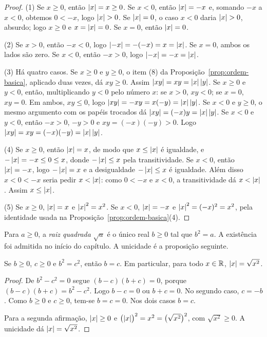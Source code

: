\documentclass[11pt,a4paper]{article}
\begin{document}
\begin{proof}
(1) Se $x\ge 0$, então $\left\lvert x \right\rvert=x\ge 0$. Se $x<0$, então $\left\lvert x \right\rvert=-x$ e, somando $-x$ a $x<0$, obtemos $0<-x$, logo $\left\lvert x \right\rvert>0$. Se $\left\lvert x \right\rvert=0$, o caso $x<0$ daria $\left\lvert x \right\rvert>0$, absurdo; logo $x\ge 0$ e $x=\left\lvert x \right\rvert=0$. Se $x=0$, então $\left\lvert x \right\rvert=0$.

(2) Se $x>0$, então $-x<0$, logo $\left\lvert -x \right\rvert=-(-x)=x=\left\lvert x \right\rvert$. Se $x=0$, ambos os lados são zero. Se $x<0$, então $-x>0$, logo $\left\lvert -x \right\rvert=-x=\left\lvert x \right\rvert$.

(3) Há quatro casos.
Se $x\ge 0$ e $y\ge 0$, o item (8) da Proposição~\ref{prop:ordem-basica}, aplicado duas vezes, dá $xy\ge 0$. Assim $\left\lvert xy \right\rvert=xy=\left\lvert x \right\rvert\left\lvert y \right\rvert$.
Se $x\ge 0$ e $y<0$, então, multiplicando $y<0$ pelo número $x$: se $x>0$, $xy<0$; se $x=0$, $xy=0$. Em ambos, $xy\le 0$, logo $\left\lvert xy \right\rvert=-xy=x(-y)=\left\lvert x \right\rvert\left\lvert y \right\rvert$.
Se $x<0$ e $y\ge 0$, o mesmo argumento com os papéis trocados dá $\left\lvert xy \right\rvert=(-x)y=\left\lvert x \right\rvert\left\lvert y \right\rvert$.
Se $x<0$ e $y<0$, então $-x>0$, $-y>0$ e $xy=(-x)(-y)>0$. Logo $\left\lvert xy \right\rvert=xy=(-x)(-y)=\left\lvert x \right\rvert\left\lvert y \right\rvert$.

(4) Se $x\ge 0$, então $\left\lvert x \right\rvert=x$, de modo que $x\le\left\lvert x \right\rvert$ é igualdade, e $-\left\lvert x \right\rvert=-x\le 0\le x$, donde $-\left\lvert x \right\rvert\le x$ pela transitividade.
Se $x<0$, então $\left\lvert x \right\rvert=-x$, logo $-\left\lvert x \right\rvert=x$ e a desigualdade $-\left\lvert x \right\rvert\le x$ é igualdade. Além disso $x<0<-x$ seria pedir $x<\left\lvert x \right\rvert$: como $0<-x$ e $x<0$, a transitividade dá $x<\left\lvert x \right\rvert$. Assim $x\le\left\lvert x \right\rvert$.

(5) Se $x\ge 0$, $\left\lvert x \right\rvert=x$ e $\left\lvert x \right\rvert^2=x^2$. Se $x<0$, $\left\lvert x \right\rvert=-x$ e $\left\lvert x \right\rvert^2=(-x)^2=x^2$, pela identidade usada na Proposição~\ref{prop:ordem-basica}(4).
\end{proof}

\begin{definicao}
Para $a\ge 0$, a \emph{raiz quadrada} $\sqrt{a}$ é o único real $b\ge 0$ tal que $b^2=a$. A existência foi admitida no início do capítulo. A unicidade é a proposição seguinte.
\end{definicao}

\begin{proposicao}\label{prop:raiz-unica}
Se $b\ge 0$, $c\ge 0$ e $b^2=c^2$, então $b=c$. Em particular, para todo $x\in\mathbb{R}$, $\left\lvert x \right\rvert=\sqrt{x^2}$.
\end{proposicao}

\begin{proof}
De $b^2-c^2=0$ segue $(b-c)(b+c)=0$, porque $(b-c)(b+c)=b^2-c^2$. Logo $b-c=0$ ou $b+c=0$. No segundo caso, $c=-b$. Como $b\ge 0$ e $c\ge 0$, tem-se $b=c=0$. Nos dois casos $b=c$.

Para a segunda afirmação, $\left\lvert x \right\rvert\ge 0$ e $\bigl(\left\lvert x \right\rvert\bigr)^2=x^2=\bigl(\sqrt{x^2}\bigr)^2$, com $\sqrt{x^2}\ge 0$. A unicidade dá $\left\lvert x \right\rvert=\sqrt{x^2}$.
\end{proof}
\end{document}
